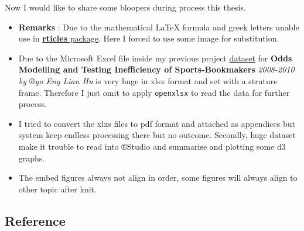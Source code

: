 \documentclass[article]{jss}
\providecommand{\tightlist}{%
  \setlength{\itemsep}{0pt}\setlength{\parskip}{0pt}}
\begin{document}
Now I would like to share some bloopers during process this thesis.

\begin{itemize}
\tightlist
\item
  \textbf{Remarks} : Due to the mathematical LaTeX formula and greek
  letters unable use in
  \href{https://github.com/rstudio/rticles}{\textbf{rticles} package}.
  Here I forced to use some image for substitution.
\item
  Due to the Microsoft Excel file inside my previous project
  \href{https://www.dropbox.com/home/Research\%20Project\%202}{dataset}
  for \textbf{Odds Modelling and Testing Inefficiency of
  Sports-Bookmakers} \emph{2008-2010 by ®yo Eng Lian Hu} is very huge in
  xlsx format and set with a struture frame. Therefore I just omit to
  apply \texttt{openxlsx} to read the data for further process.
\item
  I tried to convert the xlxs files to pdf format and attached as
  appendices but system keep endless processing there but no outcome.
  Secondly, huge dataset make it trouble to read into ®Studio and
  summarise and plotting some d3 graphs.
\item
  The embed figures always not align in order, some figures will always
  align to other topic after knit.
\end{itemize}

\subsection{Reference}\label{reference}
\end{document}
